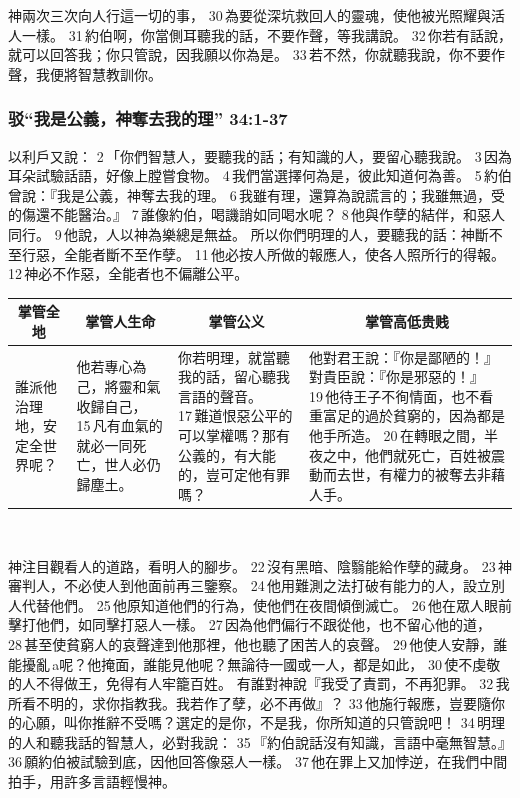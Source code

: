 神兩次三次向人行這一切的事， 30 為要從深坑救回人的靈魂，使他被光照耀與活人一樣。 31 約伯啊，你當側耳聽我的話，不要作聲，等我講說。 32 你若有話說，就可以回答我；你只管說，因我願以你為是。 33 若不然，你就聽我說，你不要作聲，我便將智慧教訓你。

\subsubsection{驳“我是公義，神奪去我的理” 34:1-37}

以利戶又說： 2 「你們智慧人，要聽我的話；有知識的人，要留心聽我說。 3 因為耳朵試驗話語，好像上膛嘗食物。 4 我們當選擇何為是，彼此知道何為善。 5 約伯曾說：『我是公義，神奪去我的理。 6 我雖有理，還算為說謊言的；我雖無過，受的傷還不能醫治。』 7 誰像約伯，喝譏誚如同喝水呢？ 8 他與作孽的結伴，和惡人同行。 9 他說，人以神為樂總是無益。
所以你們明理的人，要聽我的話：神斷不至行惡，全能者斷不至作孽。 11 他必按人所做的報應人，使各人照所行的得報。 12 神必不作惡，全能者也不偏離公平。
\begin{table}[H]
\centering
\begin{tabular}{p{1.5cm}|p{2.75cm}|p{4.00cm}|p{8.00cm}}\hline\hline
\multicolumn{1}{c|}{掌管全地}&\multicolumn{1}{c|}{掌管人生命}&\multicolumn{1}{c|}{掌管公义}&\multicolumn{1}{c}{掌管高低贵贱}\\\hline
誰派他治理地，安定全世界呢？ 
&他若專心為己，將靈和氣收歸自己， 15 凡有血氣的就必一同死亡，世人必仍歸塵土。
&你若明理，就當聽我的話，留心聽我言語的聲音。 17 難道恨惡公平的可以掌權嗎？那有公義的，有大能的，豈可定他有罪嗎？
&他對君王說：『你是鄙陋的！』對貴臣說：『你是邪惡的！』 19 他待王子不徇情面，也不看重富足的過於貧窮的，因為都是他手所造。 20 在轉眼之間，半夜之中，他們就死亡，百姓被震動而去世，有權力的被奪去非藉人手。\\\hline
\end{tabular}
\end{table} 

神注目觀看人的道路，看明人的腳步。 22 沒有黑暗、陰翳能給作孽的藏身。 23 神審判人，不必使人到他面前再三鑒察。 24 他用難測之法打破有能力的人，設立別人代替他們。 25 他原知道他們的行為，使他們在夜間傾倒滅亡。 26 他在眾人眼前擊打他們，如同擊打惡人一樣。 27 因為他們偏行不跟從他，也不留心他的道， 28 甚至使貧窮人的哀聲達到他那裡，他也聽了困苦人的哀聲。 29 他使人安靜，誰能擾亂 a呢？他掩面，誰能見他呢？無論待一國或一人，都是如此， 30 使不虔敬的人不得做王，免得有人牢籠百姓。
有誰對神說『我受了責罰，不再犯罪。 32 我所看不明的，求你指教我。我若作了孽，必不再做』？ 33 他施行報應，豈要隨你的心願，叫你推辭不受嗎？選定的是你，不是我，你所知道的只管說吧！ 34 明理的人和聽我話的智慧人，必對我說： 35 『約伯說話沒有知識，言語中毫無智慧。』 36 願約伯被試驗到底，因他回答像惡人一樣。 37 他在罪上又加悖逆，在我們中間拍手，用許多言語輕慢神。



